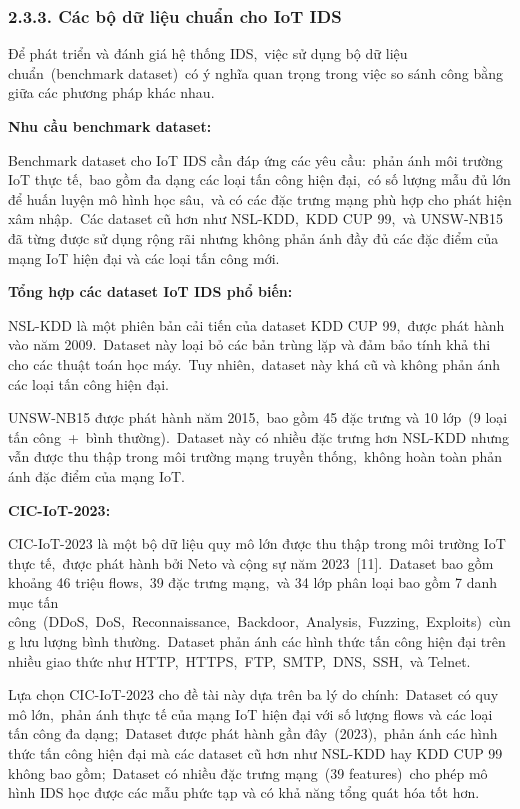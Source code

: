 \subsubsection{2.3.3. Các bộ dữ liệu chuẩn cho IoT IDS}\label{cuxe1c-bux1ed9-dux1eef-liux1ec7u-chuux1ea9n-cho-iot-ids}

Để phát triển và đánh giá hệ thống IDS,~việc sử dụng bộ dữ liệu chuẩn~(benchmark dataset)~có ý nghĩa quan trọng trong việc so sánh công bằng giữa các phương pháp khác nhau.

\textbf{Nhu cầu benchmark dataset:}

Benchmark dataset cho IoT IDS cần đáp ứng các yêu cầu:~phản ánh môi trường IoT thực tế,~bao gồm đa dạng các loại tấn công hiện đại,~có số lượng mẫu đủ lớn để huấn luyện mô hình học sâu,~và có các đặc trưng mạng phù hợp cho phát hiện xâm nhập.~Các dataset cũ hơn như NSL-KDD,~KDD CUP 99,~và UNSW-NB15 đã từng được sử dụng rộng rãi nhưng không phản ánh đầy đủ các đặc điểm của mạng IoT hiện đại và các loại tấn công mới.

\textbf{Tổng hợp các dataset IoT IDS phổ biến:}

NSL-KDD là một phiên bản cải tiến của dataset KDD CUP 99,~được phát hành vào năm 2009.~Dataset này loại bỏ các bản trùng lặp và đảm bảo tính khả thi cho các thuật toán học máy.~Tuy nhiên,~dataset này khá cũ và không phản ánh các loại tấn công hiện đại.

UNSW-NB15 được phát hành năm 2015,~bao gồm 45 đặc trưng và 10 lớp~(9 loại tấn công~+~bình thường).~Dataset này có nhiều đặc trưng hơn NSL-KDD nhưng vẫn được thu thập trong môi trường mạng truyền thống,~không hoàn toàn phản ánh đặc điểm của mạng IoT.

\textbf{CIC-IoT-2023:}

CIC-IoT-2023 là một bộ dữ liệu quy mô lớn được thu thập trong môi trường IoT thực tế,~được phát hành bởi Neto và cộng sự năm 2023~{[}11{]}.~Dataset bao gồm khoảng 46 triệu flows,~39 đặc trưng mạng,~và 34 lớp phân loại bao gồm 7 danh mục tấn công~(DDoS,~DoS,~Reconnaissance,~Backdoor,~Analysis,~Fuzzing,~Exploits)~cùng lưu lượng bình thường.~Dataset phản ánh các hình thức tấn công hiện đại trên nhiều giao thức như HTTP,~HTTPS,~FTP,~SMTP,~DNS,~SSH,~và Telnet.

Lựa chọn CIC-IoT-2023 cho đề tài này dựa trên ba lý do chính:~Dataset có quy mô lớn,~phản ánh thực tế của mạng IoT hiện đại với số lượng flows và các loại tấn công đa dạng;~Dataset được phát hành gần đây~(2023),~phản ánh các hình thức tấn công hiện đại mà các dataset cũ hơn như NSL-KDD hay KDD CUP 99 không bao gồm;~Dataset có nhiều đặc trưng mạng~(39 features)~cho phép mô hình IDS học được các mẫu phức tạp và có khả năng tổng quát hóa tốt hơn.

